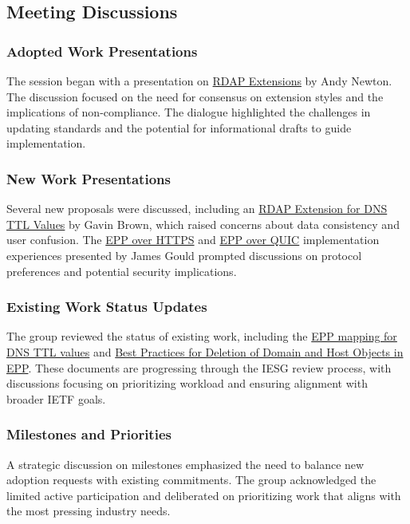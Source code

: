 \documentclass{article}
\begin{document}
\subsection{Meeting Discussions}

\subsubsection{Adopted Work Presentations}
The session began with a presentation on \href{https://datatracker.ietf.org/doc/draft-ietf-regext-rdap-extensions/}{RDAP Extensions} by Andy Newton. The discussion focused on the need for consensus on extension styles and the implications of non-compliance. The dialogue highlighted the challenges in updating standards and the potential for informational drafts to guide implementation.

\subsubsection{New Work Presentations}
Several new proposals were discussed, including an \href{https://datatracker.ietf.org/doc/draft-brown-rdap-ttl-extension/}{RDAP Extension for DNS TTL Values} by Gavin Brown, which raised concerns about data consistency and user confusion. The \href{https://datatracker.ietf.org/doc/draft-loffredo-regext-epp-over-http/}{EPP over HTTPS} and \href{https://datatracker.ietf.org/doc/draft-yao-regext-epp-quic/}{EPP over QUIC} implementation experiences presented by James Gould prompted discussions on protocol preferences and potential security implications.

\subsubsection{Existing Work Status Updates}
The group reviewed the status of existing work, including the \href{https://datatracker.ietf.org/doc/draft-ietf-regext-epp-ttl/}{EPP mapping for DNS TTL values} and \href{https://datatracker.ietf.org/doc/draft-ietf-regext-epp-delete-bcp/}{Best Practices for Deletion of Domain and Host Objects in EPP}. These documents are progressing through the IESG review process, with discussions focusing on prioritizing workload and ensuring alignment with broader IETF goals.

\subsubsection{Milestones and Priorities}
A strategic discussion on milestones emphasized the need to balance new adoption requests with existing commitments. The group acknowledged the limited active participation and deliberated on prioritizing work that aligns with the most pressing industry needs.
\end{document}
